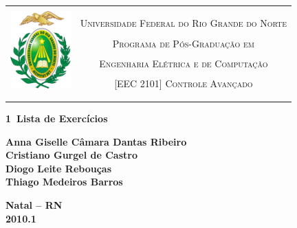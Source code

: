 \begin{titlepage}
\begin{center}

\begin{table}[h]
\centering
\setlength{\arrayrulewidth}{3.5\arrayrulewidth}
    \begin{tabular}{cc}
    \hline\\
    \multirow{5}{*}{\includegraphics[height=3cm]{imgs/ufrn}}&\\
    & \textsc{Universidade Federal do Rio Grande do Norte}\\
    & \textsc{Programa de Pós-Graduação em}\\
    & \textsc{Engenharia Elétrica e de Computação}\\
    & \textsc{[EEC 2101] Controle Avançado}\\
    &\\
    &\\
    \hline
    \end{tabular}
\end{table}


\vfill

\LARGE
\textbf{1\textordfeminine\ Lista de Exercícios}

\vfill

\normalsize
\textbf{Anna Giselle Câmara Dantas Ribeiro}\\
\textbf{Cristiano Gurgel de Castro}\\
\textbf{Diogo Leite Rebouças}\\
\textbf{Thiago Medeiros Barros}

\vfill
\textbf{Natal -- RN\\
        2010.1 }

\end{center}
\end{titlepage}
